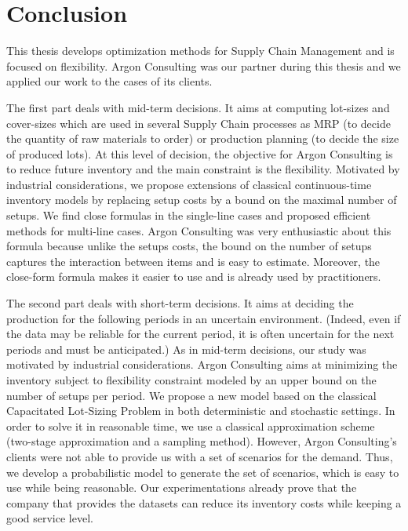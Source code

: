 \chapter*{Conclusion}
\label{chap:conclusion}


This thesis develops optimization methods for Supply Chain Management and is focused on flexibility.
Argon Consulting was our partner during this thesis and we applied our work to the cases of its clients.


The first part deals with mid-term decisions.
It aims at computing lot-sizes and cover-sizes which are used in several Supply Chain processes as MRP (to decide the quantity of raw materials to order) or production planning (to decide the size of produced lots).
At this level of decision, the objective for Argon Consulting is to reduce future inventory and the main constraint is the flexibility.
Motivated by industrial considerations, we propose extensions of classical continuous-time inventory models by replacing setup costs by a bound on the maximal number of setups.
We find close formulas in the single-line cases and proposed efficient methods for multi-line cases.
Argon Consulting was very enthusiastic about this formula because unlike the setups costs, the bound on the number of setups captures the interaction between items and is easy to estimate.
Moreover, the close-form formula makes it easier to use and is already used by practitioners.


The second part deals with short-term decisions.
It aims at deciding the production for the following periods in an uncertain environment.
(Indeed, even if the data may be reliable for the current period, it is often uncertain for the next periods and must be anticipated.)
As in mid-term decisions, our study was motivated by industrial considerations.
Argon Consulting aims at minimizing the inventory subject to flexibility constraint modeled by an upper bound on the number of setups per period.
We propose a new model based on the classical Capacitated Lot-Sizing Problem in both deterministic and stochastic settings.
In order to solve it in reasonable time, we use a classical approximation scheme (two-stage approximation and a sampling method).
However, Argon Consulting's clients were not able to provide us with a set of scenarios for the demand.
Thus, we develop a probabilistic model to generate the set of scenarios, which is easy to use while being reasonable.
Our experimentations already prove that the company that provides the datasets can reduce its inventory costs while keeping a good service level.


